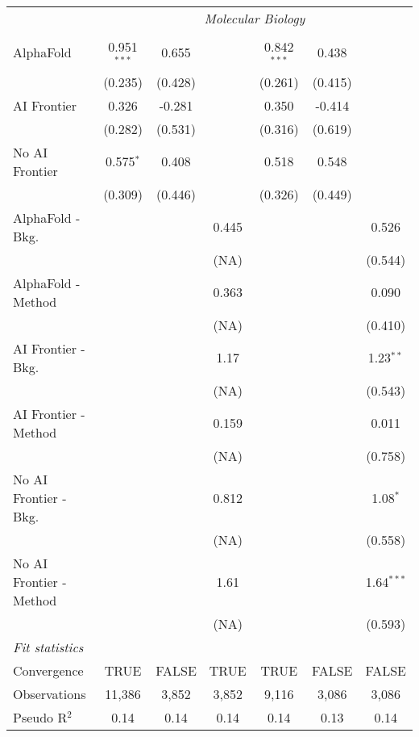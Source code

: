 \begin{tabular}{lcccccc}
 & \multicolumn{6}{c}{\textit{Molecular Biology}} \\ \\
   AlphaFold               & 0.951$^{***}$ & 0.655   &       & 0.842$^{***}$ & 0.438   &   \\   
                           & (0.235)       & (0.428) &       & (0.261)       & (0.415) &   \\   
   AI Frontier             & 0.326         & -0.281  &       & 0.350         & -0.414  &   \\   
                           & (0.282)       & (0.531) &       & (0.316)       & (0.619) &   \\   
   No AI Frontier          & 0.575$^{*}$   & 0.408   &       & 0.518         & 0.548   &   \\   
                           & (0.309)       & (0.446) &       & (0.326)       & (0.449) &   \\   
   AlphaFold - Bkg.        &               &         & 0.445 &               &         & 0.526\\   
                           &               &         & (NA)  &               &         & (0.544)\\   
   AlphaFold - Method      &               &         & 0.363 &               &         & 0.090\\   
                           &               &         & (NA)  &               &         & (0.410)\\   
   AI Frontier - Bkg.      &               &         & 1.17  &               &         & 1.23$^{**}$\\   
                           &               &         & (NA)  &               &         & (0.543)\\   
   AI Frontier - Method    &               &         & 0.159 &               &         & 0.011\\   
                           &               &         & (NA)  &               &         & (0.758)\\   
   No AI Frontier - Bkg.   &               &         & 0.812 &               &         & 1.08$^{*}$\\   
                           &               &         & (NA)  &               &         & (0.558)\\   
   No AI Frontier - Method &               &         & 1.61  &               &         & 1.64$^{***}$\\   
                           &               &         & (NA)  &               &         & (0.593)\\   
   \midrule
   \emph{Fit statistics}\\
   Convergence             &TRUE           & FALSE   & TRUE  & TRUE          & FALSE   & FALSE\\  
   Observations            & 11,386        & 3,852   & 3,852 & 9,116         & 3,086   & 3,086\\  
   Pseudo R$^2$            & 0.14          & 0.14    & 0.14  & 0.14          & 0.13    & 0.14\\  
   

\end{tabular}
